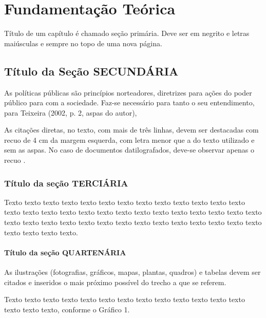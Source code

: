 \chapter{Fundamentação Teórica} \label{cha:fundamentacao}

Título de um capítulo é chamado seção primária. Deve ser em negrito e letras maiúsculas e sempre no topo de uma nova página. 

\cite{de2011associaccao}


\section{Título da Seção SECUNDÁRIA}
As políticas públicas são princípios norteadores, diretrizes para ações do 
poder público para com a sociedade. Faz-se necessário para tanto o seu 
entendimento, para Teixeira (2002, p. 2, aspas do autor),

\begin{citacao}
As citações diretas, no texto, com mais de três linhas, devem ser
destacadas com recuo de 4 cm da margem esquerda, com letra menor que a do texto
utilizado e sem as aspas. No caso de documentos datilografados, deve-se
observar apenas o recuo \cite[5.3]{NBR10520:2002}.
\end{citacao}

\subsection{Título da seção TERCIÁRIA}

Texto texto texto texto texto texto texto texto texto texto texto texto texto texto 
texto texto texto texto texto texto texto texto texto texto texto texto texto texto texto 
texto texto texto texto texto texto texto texto texto texto texto texto texto texto texto 
texto. 

\subsubsection{Título da seção QUARTENÁRIA}

As ilustrações (fotografias, gráficos, mapas, plantas, quadros) e tabelas 
devem ser citados e inseridos o mais próximo possível do trecho a que se referem. 

Texto texto texto texto texto texto texto texto texto texto texto texto texto texto texto 
texto, conforme o Gráfico 1.

